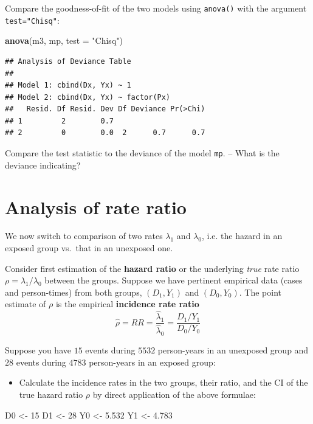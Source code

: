 \documentclass[
]{book}
\newenvironment{Shaded}{\begin{snugshade}}{\end{snugshade}}
\newcommand{\AttributeTok}[1]{\textcolor[rgb]{0.13,0.29,0.53}{#1}}
\newcommand{\DecValTok}[1]{\textcolor[rgb]{0.00,0.00,0.81}{#1}}
\newcommand{\FloatTok}[1]{\textcolor[rgb]{0.00,0.00,0.81}{#1}}
\newcommand{\FunctionTok}[1]{\textcolor[rgb]{0.13,0.29,0.53}{\textbf{#1}}}
\newcommand{\NormalTok}[1]{#1}
\newcommand{\OtherTok}[1]{\textcolor[rgb]{0.56,0.35,0.01}{#1}}
\newcommand{\StringTok}[1]{\textcolor[rgb]{0.31,0.60,0.02}{#1}}
\providecommand{\tightlist}{%
  \setlength{\itemsep}{0pt}\setlength{\parskip}{0pt}}
\theoremstyle{definition}
\theoremstyle{definition}
\theoremstyle{definition}
\theoremstyle{definition}
\theoremstyle{remark}
\begin{document}
Compare the goodness-of-fit of the two models using \texttt{anova()} with the argument
\texttt{test="Chisq"}:

\begin{Shaded}
\begin{Highlighting}[]
\FunctionTok{anova}\NormalTok{(m3, mp, }\AttributeTok{test =} \StringTok{"Chisq"}\NormalTok{)}
\end{Highlighting}
\end{Shaded}

\begin{verbatim}
## Analysis of Deviance Table
## 
## Model 1: cbind(Dx, Yx) ~ 1
## Model 2: cbind(Dx, Yx) ~ factor(Px)
##   Resid. Df Resid. Dev Df Deviance Pr(>Chi)
## 1         2        0.7                     
## 2         0        0.0  2      0.7      0.7
\end{verbatim}

Compare the test statistic to the deviance of the model \texttt{mp}.
-- What is the deviance indicating?

\section{Analysis of rate ratio}\label{analysis-of-rate-ratio}

We now switch to comparison of two rates \(\lambda_1\) and \(\lambda_0\), i.e.
the hazard in an exposed group vs.~that in an unexposed one.

Consider first estimation of the \textbf{hazard ratio} or the underlying \emph{true} rate ratio
\(\rho = \lambda_1/\lambda_0\) between the groups. Suppose we have
pertinent empirical data (cases and person-times) from both groups,
\((D_1,Y_1)\) and \((D_0,Y_0)\). The point estimate of \(\rho\) is the
empirical \textbf{incidence rate ratio}
\[
\widehat{\rho} = RR = \frac{\widehat\lambda_1}{\widehat\lambda_0} = \frac{D_1/Y_1}{D_0/Y_0}
\]

Suppose you have \(15\) events during \(5532\) person-years in an
unexposed group and \(28\) events during \(4783\) person-years in an
exposed group:

\begin{itemize}
\tightlist
\item
  Calculate the incidence rates in the two groups, their ratio, and the CI of the true hazard ratio \(\rho\) by direct application of the above formulae:
\end{itemize}

\begin{Shaded}
\begin{Highlighting}[]
\NormalTok{D0 }\OtherTok{\textless{}{-}} \DecValTok{15}
\NormalTok{D1 }\OtherTok{\textless{}{-}} \DecValTok{28}
\NormalTok{Y0 }\OtherTok{\textless{}{-}} \FloatTok{5.532}
\NormalTok{Y1 }\OtherTok{\textless{}{-}} \FloatTok{4.783}
\end{Highlighting}
\end{Shaded}
\end{document}
